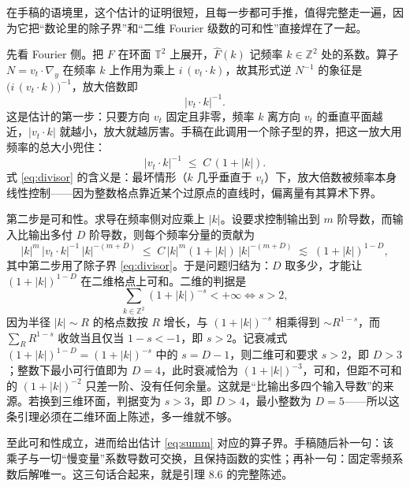 在手稿的语境里，这个估计的证明很短，且每一步都可手推，值得完整走一遍，因为它把“数论里的除子界”和“二维 Fourier 级数的可和性”直接焊在了一起。

先看 Fourier 侧。把 $F$ 在环面 $\mathbb{T}^{2}$ 上展开，$\widehat{F}(k)$ 记频率 $k\in\mathbb{Z}^{2}$ 处的系数。算子 $N=v_{t}\cdot\nabla_{y}$ 在频率 $k$ 上作用为乘上 $i\,(v_{t}\cdot k)$，故其形式逆 $N^{-1}$ 的象征是 $\big(i\,(v_{t}\cdot k)\big)^{-1}$，放大倍数即
\begin{equation}
\big|v_{t}\cdot k\big|^{-1}.
\end{equation}
这是估计的第一步：只要方向 $v_{t}$ 固定且非零，频率 $k$ 离方向 $v_{t}$ 的垂直平面越近，$|v_{t}\cdot k|$ 就越小，放大就越厉害。手稿在此调用一个除子型的界，把这一放大用频率的总大小兜住：
\begin{equation}
\big|v_{t}\cdot k\big|^{-1}\;\le\;C\,(1+|k|).
\label{eq:divisor}
\end{equation}
式 \eqref{eq:divisor} 的含义是：最坏情形（$k$ 几乎垂直于 $v_{t}$）下，放大倍数被频率本身线性控制——因为整数格点靠近某个过原点的直线时，偏离量有其算术下界。

第二步是可和性。求导在频率侧对应乘上 $|k|$。设要求控制输出到 $m$ 阶导数，而输入比输出多付 $D$ 阶导数，则每个频率分量的贡献为
\begin{equation}
|k|^{m}\,\big|v_{t}\cdot k\big|^{-1}\,|k|^{-(m+D)}
\;\le\;C\,|k|^{m}(1+|k|)\,|k|^{-(m+D)}
\;\lesssim\;(1+|k|)^{1-D},
\label{eq:summ}
\end{equation}
其中第二步用了除子界 \eqref{eq:divisor}。于是问题归结为：$D$ 取多少，才能让 $(1+|k|)^{1-D}$ 在二维格点上可和。二维的判据是
\begin{equation}
\sum_{k\in\mathbb{Z}^{2}}(1+|k|)^{-s}<+\infty\iff s>2,
\end{equation}
因为半径 $|k|\sim R$ 的格点数按 $R$ 增长，与 $(1+|k|)^{-s}$ 相乘得到 $\sim R^{1-s}$，而 $\sum_{R}R^{1-s}$ 收敛当且仅当 $1-s<-1$，即 $s>2$。记衰减式 $(1+|k|)^{1-D}=(1+|k|)^{-s}$ 中的 $s=D-1$，则二维可和要求 $s>2$，即 $D>3$；整数下最小可行值即为 $D=4$，此时衰减恰为 $(1+|k|)^{-3}$，可和，但距不可和的 $(1+|k|)^{-2}$ 只差一阶、没有任何余量。这就是“比输出多四个输入导数”的来源。若换到三维环面，判据变为 $s>3$，即 $D>4$，最小整数为 $D=5$——所以这条引理必须在二维环面上陈述，多一维就不够。

至此可和性成立，进而给出估计 \eqref{eq:summ} 对应的算子界。手稿随后补一句：该乘子与一切“慢变量”系数导数可交换，且保持函数的实性；再补一句：固定零频系数后解唯一。这三句话合起来，就是引理 8.6 的完整陈述。

